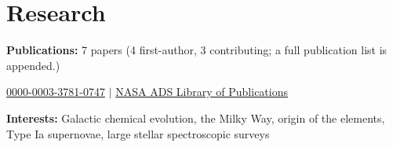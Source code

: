 \section*{Research}

\noindent
{\bf Publications:} 7 papers (4 first-author, 3 contributing; a full publication list is appended.) 

 \href{https://orcid.org/0000-0003-3781-0747}{0000-0003-3781-0747} $\vert$
\href{https://ui.adsabs.harvard.edu/public-libraries/EW_Q9nAyQkue5ChHIAT6SQ}{NASA ADS Library of Publications}


\vspace{12pt}
\noindent
{\bf Interests:}
Galactic chemical evolution, the Milky Way, origin of the elements, Type Ia supernovae, large stellar spectroscopic surveys
